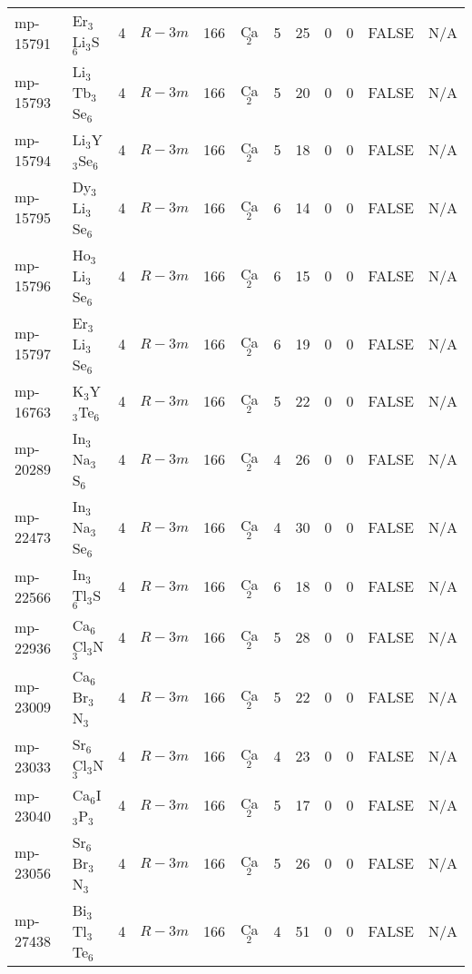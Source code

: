 {\begin{longtable}{llcccccccccc}
    mp-15791 & Er$_{3}$Li$_{3}$S$_{6}$ & 4     & $R-3m$ & 166   & Ca$_{2}$ & 5     & 25    & 0     & 0     & FALSE & N/A \\
    mp-15793 & Li$_{3}$Tb$_{3}$Se$_{6}$ & 4     & $R-3m$ & 166   & Ca$_{2}$ & 5     & 20    & 0     & 0     & FALSE & N/A \\
    mp-15794 & Li$_{3}$Y$_{3}$Se$_{6}$ & 4     & $R-3m$ & 166   & Ca$_{2}$ & 5     & 18    & 0     & 0     & FALSE & N/A \\
    mp-15795 & Dy$_{3}$Li$_{3}$Se$_{6}$ & 4     & $R-3m$ & 166   & Ca$_{2}$ & 6     & 14    & 0     & 0     & FALSE & N/A \\
    mp-15796 & Ho$_{3}$Li$_{3}$Se$_{6}$ & 4     & $R-3m$ & 166   & Ca$_{2}$ & 6     & 15    & 0     & 0     & FALSE & N/A \\
    mp-15797 & Er$_{3}$Li$_{3}$Se$_{6}$ & 4     & $R-3m$ & 166   & Ca$_{2}$ & 6     & 19    & 0     & 0     & FALSE & N/A \\
    mp-16763 & K$_{3}$Y$_{3}$Te$_{6}$ & 4     & $R-3m$ & 166   & Ca$_{2}$ & 5     & 22    & 0     & 0     & FALSE & N/A \\
    mp-20289 & In$_{3}$Na$_{3}$S$_{6}$ & 4     & $R-3m$ & 166   & Ca$_{2}$ & 4     & 26    & 0     & 0     & FALSE & N/A \\
    mp-22473 & In$_{3}$Na$_{3}$Se$_{6}$ & 4     & $R-3m$ & 166   & Ca$_{2}$ & 4     & 30    & 0     & 0     & FALSE & N/A \\
    mp-22566 & In$_{3}$Tl$_{3}$S$_{6}$ & 4     & $R-3m$ & 166   & Ca$_{2}$ & 6     & 18    & 0     & 0     & FALSE & N/A \\
    mp-22936 & Ca$_{6}$Cl$_{3}$N$_{3}$ & 4     & $R-3m$ & 166   & Ca$_{2}$ & 5     & 28    & 0     & 0     & FALSE & N/A \\
    mp-23009 & Ca$_{6}$Br$_{3}$N$_{3}$ & 4     & $R-3m$ & 166   & Ca$_{2}$ & 5     & 22    & 0     & 0     & FALSE & N/A \\
    mp-23033 & Sr$_{6}$Cl$_{3}$N$_{3}$ & 4     & $R-3m$ & 166   & Ca$_{2}$ & 4     & 23    & 0     & 0     & FALSE & N/A \\
    mp-23040 & Ca$_{6}$I$_{3}$P$_{3}$ & 4     & $R-3m$ & 166   & Ca$_{2}$ & 5     & 17    & 0     & 0     & FALSE & N/A \\
    mp-23056 & Sr$_{6}$Br$_{3}$N$_{3}$ & 4     & $R-3m$ & 166   & Ca$_{2}$ & 5     & 26    & 0     & 0     & FALSE & N/A \\
    mp-27438 & Bi$_{3}$Tl$_{3}$Te$_{6}$ & 4     & $R-3m$ & 166   & Ca$_{2}$ & 4     & 51    & 0     & 0     & FALSE & N/A \\

\end{longtable}}
